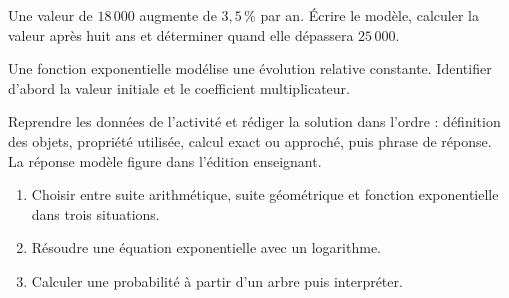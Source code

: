 \begin{activite}
Une valeur de $18\,000$ augmente de $3{,}5\,\%$ par an. Écrire le modèle, calculer la valeur après huit ans et déterminer quand elle dépassera $25\,000$.
\begin{center}\end{center}
\end{activite}

\begin{traceecrite}Une fonction exponentielle modélise une évolution relative constante. Identifier d'abord la valeur initiale et le coefficient multiplicateur.\end{traceecrite}

\begin{exemple}
Reprendre les données de l'activité et rédiger la solution dans l'ordre : définition des objets, propriété utilisée, calcul exact ou approché, puis phrase de réponse. La réponse modèle figure dans l'édition enseignant.
\end{exemple}

\begin{exercice}[-- essentiel]
\begin{enumerate}\item Choisir entre suite arithmétique, suite géométrique et fonction exponentielle dans trois situations.\item Résoudre une équation exponentielle avec un logarithme.\item Calculer une probabilité à partir d'un arbre puis interpréter.\end{enumerate}
\end{exercice}

